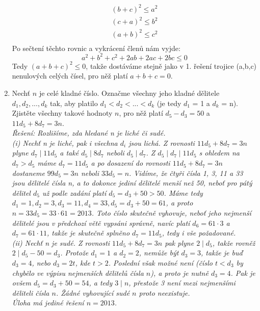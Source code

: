 \documentclass[12pt,a4paper]{report}
\begin{document}
\begin{enumerate}
{\begin{align*}
		(b+c)^2 \leq a^2\\
		(c+a)^2 \leq b^2\\
		(a+b)^2 \leq c^2\\
		\end{align*}
		Po sečtení těchto rovnic a vykrácení členů nám vyjde: $$a^2 + b^2 + c^2 +2ab+2ac+2bc \leq 0$$ Tedy $(a+b+c)^2\leq0$, takže dostáváme stejně jako v 1. řešení trojice (a,b,c) nenulových celých čísel, pro něž platí $a + b + c = 0$.}
	\item Nechť $n$ je celé kladné číslo. Označme všechny jeho kladné dělitele $d_1, d_2, . . . , d_k$
	tak, aby platilo $d_1 < d_2 < . . . < d_k$ (je tedy $d_1$ = 1 a $d_k$ = n). Zjistěte všechny
	takové hodnoty $n$, pro něž platí $d_5 -d_3 = 50$ a $11d_5 + 8d_7 = 3n$.
	\\ \textit{Řešení: Rozlišíme, zda hledané n je liché či sudé.
		\\(i) Nechť n je liché, pak i všechna $d_i$ jsou lichá. Z rovnosti $11d_5 + 8d_7 = 3n$ plyne $d_7 \mid 11d_5$ a také $d_5 \mid 8d_7$ neboli $d_5 \mid d_7$. Z $d_5 \mid d_7 \mid 11d_5$ s ohledem na $d_7 > d_5$ máme $d_7 = 11d_5$ a po dosazení do rovnosti $11d_5+8d_7 = 3n$ dostaneme $99d_5 = 3n$ neboli $33d_5 = n$. Vidíme, že čtyři čísla 1, 3, 11 a 33 jsou dělitelé čísla n, a to dokonce jediní dělitelé menší než 50, neboť pro pátý dělitel $d_5$ už podle zadání platí $d_5 = d_3 + 50 > 50$. Máme tedy $d_1 = 1, d_2 = 3, d_3 = 11, d_4 = 33, d_5 = d_3 + 50 = 61$, a proto $n = 33d_5 = 33 \cdot 61 = 2 013$. Toto číslo skutečně vyhovuje, neboť jeho nejmenší dělitelé jsou v předchozí větě vypsáni správně, navíc platí $d_6 = 61\cdot3 $ a $d_7 = 61 \cdot 11$, takže je skutečně splněno $d_7 = 11d_5$, tedy i vše požadované.
		\\(ii) Nechť n je sudé. Z rovnosti $11d_5 + 8d_7 = 3n$ pak plyne $2 \mid d_5$, takže rovněž
		$2 \mid d_5 - 50 = d_3$. Protože $d_1 = 1$ a $d_2 = 2$, nemůže být $d_3 = 3$, takže je buď $d_3 = 4$,
		nebo $d_3 = 2t$, kde $t > 2$. Poslední však možné není (číslo $t < d_3$ by chybělo ve výpisu
		nejmenších dělitelů čísla $n$), a proto je nutně $d_3 = 4$. Pak je ovšem $d_5 = d_3 + 50 = 54$,
		a tedy $3 \mid n$, přestože 3 není mezi nejmenšími děliteli čísla $n$. Žádné vyhovující sudé $n$
		proto neexistuje.
		\\Úloha má jediné řešení $n = 2 013$.}
\end{enumerate}	

	
	
	
\newpage
\end{document}
